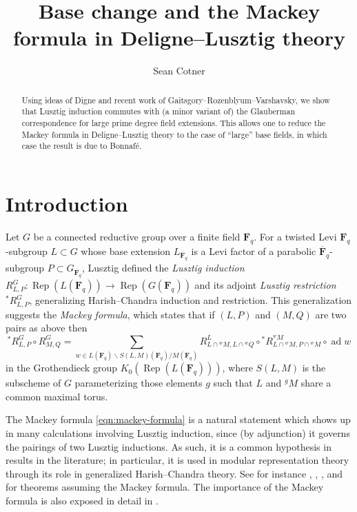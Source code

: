 \documentclass[11pt,reqno]{amsart}
\title{Base change and the Mackey formula in Deligne--Lusztig theory}
\author{Sean Cotner}
\theoremstyle{definition}
\newcommand{\F}{{\mathbf F}}
\DeclareMathOperator{\ad}{ad}
\DeclareMathOperator{\Rep}{Rep}
\newcommand{\ol}[1]{\overline{#1}}
\begin{document}
\begin{abstract}
    Using ideas of Digne and recent work of Gaitsgory--Rozenblyum--Varshavsky, we show that Lusztig induction commutes with (a minor variant of) the Glauberman correspondence for large prime degree field extensions. This allows one to reduce the Mackey formula in Deligne--Lusztig theory to the case of ``large'' base fields, in which case the result is due to Bonnaf\'e.
\end{abstract}


\maketitle

\section{Introduction}

Let $G$ be a connected reductive group over a finite field $\F_q$. For a twisted Levi $\F_q$-subgroup $L \subset G$ whose base extension $L_{\ol\F_q}$ is a Levi factor of a parabolic $\ol\F_q$-subgroup $P \subset G_{\ol\F_q}$, Lusztig defined the \emph{Lusztig induction} $R_{L, P}^G\colon \Rep(L(\F_q)) \to \Rep(G(\F_q))$ and its adjoint \emph{Lusztig restriction} $^*R^G_{L, P}$, generalizing Harish--Chandra induction and restriction. This generalization suggests the \emph{Mackey formula}, which states that if $(L, P)$ and $(M, Q)$ are two pairs as above then
\begin{equation}\label{eqn:mackey-formula}
    ^*R^G_{L, P} \circ R_{M, Q}^G = \sum_{w \in L(\F_q)\backslash S(L,M)(\F_q)/M(\F_q)} R_{L \cap {}^wM, L \cap {}^wQ}^L \circ {}^*R_{L \cap {}^wM, P\cap {}^wM}^{^wM} \circ \ad w
\end{equation}
in the Grothendieck group $K_0(\Rep(L(\F_q)))$, where $S(L,M)$ is the subscheme of $G$ parameterizing those elements $g$ such that $L$ and $^gM$ share a common maximal torus.

The Mackey formula \eqref{eqn:mackey-formula} is a natural statement which shows up in many calculations involving Lusztig induction, since (by adjunction) it governs the pairings of two Lusztig inductions. As such, it is a common hypothesis in results in the literature; in particular, it is used in modular representation theory through its role in generalized Harish--Chandra theory. See for instance \cite{Eng13}, \cite[\S 4.7]{GM20}, \cite{Hol22}, and \cite{Ros25} for theorems assuming the Mackey formula. The importance of the Mackey formula is also exposed in detail in \cite{DM20}.
\end{document}
